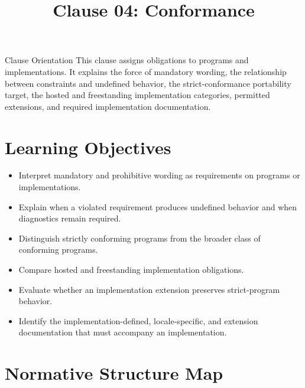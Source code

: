 \documentclass[10pt,letterpaper]{article}
\title{Clause 04: Conformance}
\author{}
\date{}
\begin{document}
\maketitle



\begin{CornellOverviewBox}{Clause Orientation}
This clause assigns obligations to programs and implementations. It explains the force of mandatory wording, the relationship between constraints and undefined behavior, the strict-conformance portability target, the hosted and freestanding implementation categories, permitted extensions, and required implementation documentation.
\end{CornellOverviewBox}

\section{Learning Objectives}
\begin{itemize}
  \item Interpret mandatory and prohibitive wording as requirements on programs or implementations.
  \item Explain when a violated requirement produces undefined behavior and when diagnostics remain required.
  \item Distinguish strictly conforming programs from the broader class of conforming programs.
  \item Compare hosted and freestanding implementation obligations.
  \item Evaluate whether an implementation extension preserves strict-program behavior.
  \item Identify the implementation-defined, locale-specific, and extension documentation that must accompany an implementation.
\end{itemize}

\section{Normative Structure Map}
\begin{CornellNotesTable}
\end{CornellNotesTable}
\end{document}

